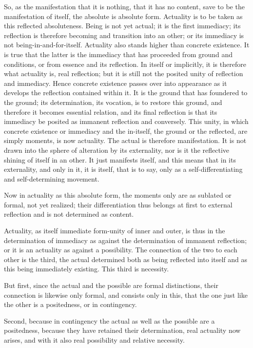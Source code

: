So, as the manifestation that it is nothing,
that it has no content, save to be
the manifestation of itself,
the absolute is absolute form.
Actuality is to be taken as
this reflected absoluteness.
Being is not yet actual;
it is the first immediacy;
its reflection is therefore becoming
and transition into an other;
or its immediacy is not being-in-and-for-itself.
Actuality also stands higher than concrete existence.
It is true that the latter is the immediacy
that has proceeded from ground and conditions,
or from essence and its reflection.
In itself or implicitly, it is therefore
what actuality is, real reflection;
but it is still not the posited unity of reflection and immediacy.
Hence concrete existence passes over into appearance
as it develops the reflection contained within it.
It is the ground that has foundered to the ground;
its determination, its vocation, is to restore this ground,
and therefore it becomes essential relation,
and its final reflection is that its
immediacy be posited as immanent reflection and conversely.
This unity, in which concrete existence
or immediacy and the in-itself,
the ground or the reflected, are simply moments,
is now actuality.
The actual is therefore manifestation.
It is not drawn into
the sphere of alteration by its externality,
nor is it the reflective shining of itself in an other.
It just manifests itself,
and this means that in its externality,
and only in it, it is itself, that is to say,
only as a self-differentiating and self-determining movement.

Now in actuality as this absolute form,
the moments only are as sublated or formal, not yet realized;
their differentiation thus belongs at first to external reflection
and is not determined as content.

Actuality, as itself immediate form-unity of inner and outer,
is thus in the determination of immediacy
as against the determination of immanent reflection;
or it is an actuality as against a possibility.
The connection of the two to each other is the third,
the actual determined both as being reflected into itself
and as this being immediately existing.
This third is necessity.

But first, since the actual and the possible
are formal distinctions,
their connection is likewise only formal,
and consists only in this,
that the one just like the other
is a positedness, or in contingency.

Second, because in contingency
the actual as well as the possible
are a positedness,
because they have retained their determination,
real actuality now arises,
and with it also real possibility
and relative necessity.

